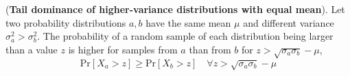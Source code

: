 %
\begin{lemma}
\label{lemma-same_mean_different_variance_bound} 
%
(\textbf{Tail dominance of higher-variance distributions with equal mean}).
%
Let two probability distributions $a,b$ have the same mean $\mu$ and different variance $\sigma_a^2>\sigma_b^2$. 
%
The probability of a random sample of each distribution being larger than a value $z$ is higher for samples from $a$ than from $b$ for $z>\sqrt{\sigma_a \sigma_b} - \mu$,
%
\begin{equation}
    \text{Pr}\left[X_a>z\right]\geq \text{Pr}\left[X_b>z\right]\quad \forall z> \sqrt{\sigma_a \sigma_b} - \mu
\end{equation}
%
\end{lemma}
%